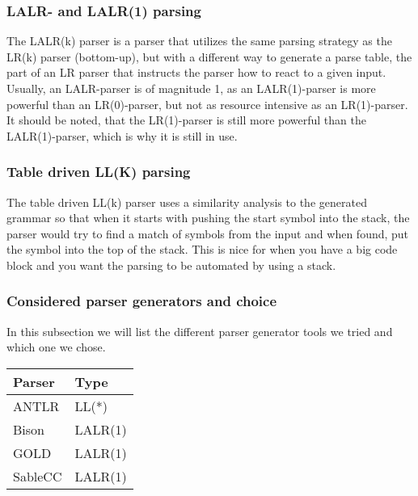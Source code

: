 \subsubsection*{LALR- and LALR(1) parsing}
The LALR(k) parser is a parser that utilizes the same parsing strategy as the LR(k) parser (bottom-up), but with a different way to generate a parse table, the part of an LR parser that instructs the parser how to react to a given input. Usually, an LALR-parser is of magnitude 1, as an LALR(1)-parser is more powerful than an LR(0)-parser, but not as resource intensive as an LR(1)-parser. It should be noted, that the LR(1)-parser is still more powerful than the LALR(1)-parser, which is why it is still in use\cite{crafting-a-compiler}.

\subsubsection*{Table driven LL(K) parsing}
The table driven LL(k) parser uses a similarity analysis to the generated grammar so that when it starts with pushing the start symbol into the stack, the parser would try to find a match of symbols from the input and when found, put the symbol into the top of the stack\cite{crafting-a-compiler}. This is nice for when you have a big code block and you want the parsing to be automated by using a stack.

\subsubsection{Considered parser generators and choice}
In this subsection we will list the different parser generator tools we tried and which one we chose. \\

\begin{table}[h]
\centering
\begin{tabular}{@{}ll@{}}
\toprule
\textbf{Parser} & \textbf{Type} \\ \midrule
ANTLR           & LL(*)         \\
Bison           & LALR(1)       \\
GOLD            & LALR(1)       \\
SableCC         & LALR(1)       \\ \bottomrule
\end{tabular}
\label{parser_table}
\end{table}

